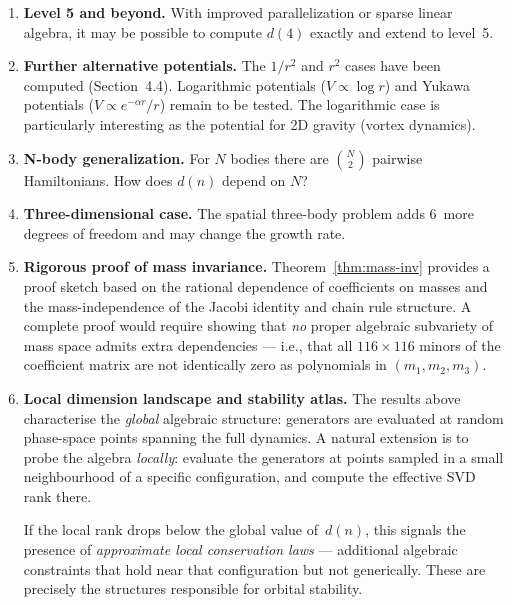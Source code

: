 \documentclass[11pt,a4paper]{article}
\theoremstyle{remark}
\begin{document}
\begin{enumerate}
  \item \textbf{Level 5 and beyond.} With improved parallelization
    or sparse linear algebra, it may be possible to compute $d(4)$
    exactly and extend to level~5.

  \item \textbf{Further alternative potentials.}  The $1/r^2$
    and $r^2$ cases have been computed (Section~4.4).
    Logarithmic potentials ($V \propto \log r$) and Yukawa
    potentials ($V \propto e^{-\alpha r}/r$) remain to be tested.
    The logarithmic case is particularly interesting as the
    potential for 2D gravity (vortex dynamics).

  \item \textbf{N-body generalization.}  For $N$ bodies there are
    $\binom{N}{2}$ pairwise Hamiltonians.  How does $d(n)$
    depend on $N$?

  \item \textbf{Three-dimensional case.}  The spatial three-body
    problem adds 6~more degrees of freedom and may change the
    growth rate.

  \item \textbf{Rigorous proof of mass invariance.}
    Theorem~\ref{thm:mass-inv} provides a proof sketch based on
    the rational dependence of coefficients on masses and the
    mass-independence of the Jacobi identity and chain rule
    structure.  A complete proof would require showing that
    \emph{no} proper algebraic subvariety of mass space admits
    extra dependencies --- i.e., that all $116 \times 116$ minors
    of the coefficient matrix are not identically zero as
    polynomials in $(m_1, m_2, m_3)$.

  \item \textbf{Local dimension landscape and stability atlas.}
    The results above characterise the \emph{global} algebraic
    structure: generators are evaluated at random phase-space
    points spanning the full dynamics.  A natural extension is to
    probe the algebra \emph{locally}: evaluate the generators at
    points sampled in a small neighbourhood of a specific
    configuration, and compute the effective SVD rank there.

    If the local rank drops below the global value of~$d(n)$, this
    signals the presence of \emph{approximate local conservation
    laws} --- additional algebraic constraints that hold near that
    configuration but not generically.  These are precisely the
    structures responsible for orbital stability.


\end{enumerate}
\end{document}
